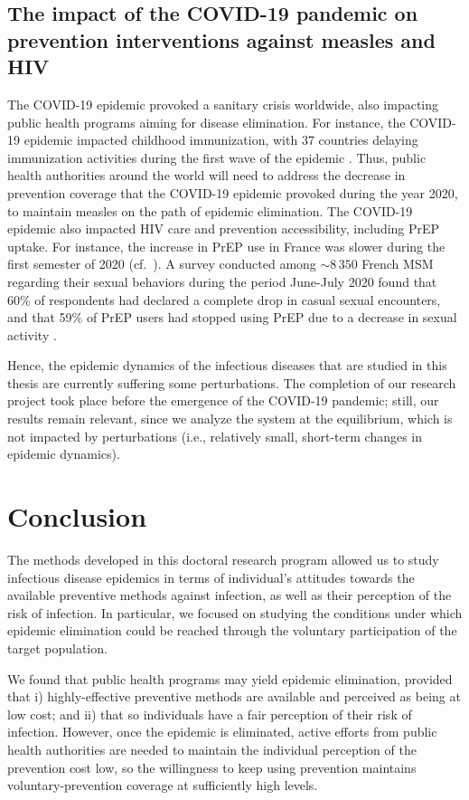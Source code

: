 \subsection{The impact of the COVID-19 pandemic on prevention interventions against measles and HIV}
The COVID-19 epidemic provoked a sanitary crisis worldwide, also impacting public health programs aiming for disease elimination. For instance, the COVID-19 epidemic impacted childhood immunization, with 37 countries delaying immunization activities during the first wave of the epidemic \cite[]{WHO_CovidMeasles}. Thus, public health authorities around the world will need to address the decrease in prevention coverage that the COVID-19 epidemic provoked during the year 2020, to maintain measles on the path of epidemic elimination. The COVID-19 epidemic also impacted HIV care and prevention accessibility, including PrEP uptake. For instance, the increase in PrEP use in France was slower during the first semester of 2020 (cf.~). A survey conducted among $\sim8\,350$ French MSM regarding their sexual behaviors during the period June-July 2020 found that 60\% of respondents had declared a complete drop in casual sexual encounters, and that 59\% of PrEP users had stopped using PrEP due to a decrease in sexual activity \cite[]{Velter2020}. 

Hence, the epidemic dynamics of the infectious diseases that are studied in this thesis are currently suffering some perturbations. The completion of our research project took place before the emergence of the COVID-19 pandemic; still, our results remain relevant, since we analyze the system at the equilibrium, which is not impacted by perturbations (i.e., relatively small, short-term changes in epidemic dynamics). 

\section{Conclusion}
The methods developed in this doctoral research program allowed us to study infectious disease epidemics in terms of individual's attitudes towards the available preventive methods against infection, as well as their perception of the risk of infection. In particular, we focused on studying the conditions under which epidemic elimination could be reached through the voluntary participation of the target population.

We found that public health programs may yield epidemic elimination, provided that i) highly-effective preventive methods are available and perceived as being at low cost; and ii) that so individuals have a fair perception of their risk of infection. However, once the epidemic is eliminated, active efforts from public health authorities are needed to maintain the individual perception of the prevention cost low, so the willingness to keep using prevention maintains voluntary-prevention coverage at sufficiently high levels.

